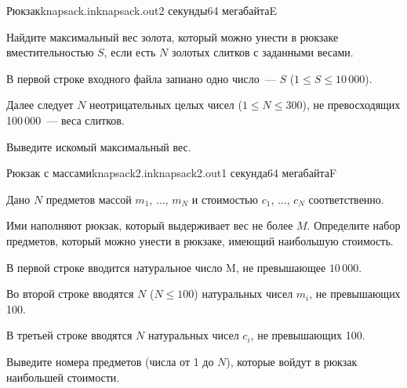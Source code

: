\documentclass[12pt,a4paper,oneside,twocolumn,landscape]{article}
\renewcommand{\le}{\leqslant}
\begin{document}
\bigskip\bigskip
\begin{problem}{Рюкзак}{knapsack.in}{knapsack.out}{2 секунды}{64 мегабайта}{E}
\graphicspath{{../knapsack/statements/}}


Найдите максимальный вес золота, который можно унести в рюкзаке вместительностью $S$, если есть $N$ золотых слитков с заданными весами.



\InputFile
В первой строке входного файла запиано одно число~--- $S$ ($1 \leqslant S \leqslant 10\,000$). 

Далее следует $N$ неотрицательных целых чисел ($1 \leqslant N \leqslant 300$), не превосходящих 100\,000~--- веса слитков.

\OutputFile
Выведите искомый максимальный вес.


\Examples

\begin{example}
%
%
\end{example}


\end{problem}

\bigskip\bigskip
\begin{problem}{Рюкзак с массами}{knapsack2.in}{knapsack2.out}{1 секунда}{64 мегабайта}{F}
\graphicspath{{../knapsack2/statements/}}
Дано $N$ предметов массой $m_1$, $\dots$, $m_N$ и стоимостью $c_1$, $\dots$, $c_N$ 
соответственно.

Ими наполняют рюкзак, который выдерживает вес не более $M$. 
Определите набор предметов, который можно унести в рюкзаке, имеющий наибольшую стоимость.

\InputFile
В первой строке вводится натуральное число M, не превышающее $10\,000$.

Во второй строке вводятся $N$ ($N \le 100$) натуральных чисел $m_i$, не превышающих 100.

В третьей строке вводятся $N$ натуральных чисел $c_i$, не превышающих 100.

\OutputFile
Выведите номера предметов (числа от 1 до $N$), 
которые войдут в рюкзак наибольшей стоимости.


\Example

\begin{example}
%
\end{example}


\end{problem}
\end{document}
